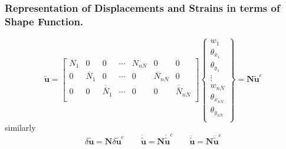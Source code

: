 \documentclass[9pt]{beamer}
\begin{document}
\begin{frame}
\frametitle{Representation of Displacements and Strains in terms of Shape Function.}

\begin{equation*}
\tilde{\mathbf{u}}= 
\begin{bmatrix}
N_1 & 0 & 0  & \cdots & N_{nN} & 0 & 0 \\
0 & \overline{N}_1 & 0  & \cdots & 0 & \overline{N}_{nN} & 0 \\
0 & 0 & \overline{\overline{N}}_1 & \cdots & 0 & 0 & \overline{\overline{N}}_{nN} \\
\end{bmatrix}
\left\{
\begin{array}{r}
w_1 \\
\theta_{x_1} \\
\theta_{y_1} \\
\vdots \\
w_{nN} \\
\theta_{x_{nN}} \\
\theta_{y_{nN}} \\
\end{array} \right\}
=
\mathbf{N} \tilde{\mathbf{u}}^e 
\end{equation*}
similarly
\begin{equation}
\delta \tilde{\mathbf{ u }} = \mathbf{N} \delta \tilde{\mathbf{u}}^e \qquad  
\dot{\tilde{ \mathbf{ u}} } = \mathbf{N}  \dot{\tilde{\mathbf{u}}}^e
 \qquad  
\ddot{\tilde{ \mathbf{ u}} } = \mathbf{N}  \ddot{\tilde{\mathbf{u}}}^e
\end{equation}
\end{frame}
\end{document}
